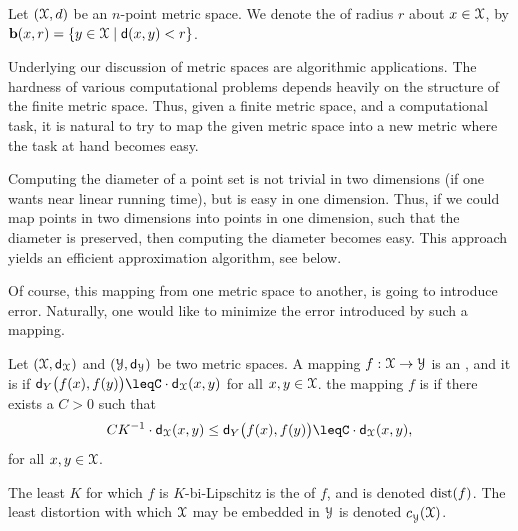 \begin{defn}
    Let $(\FMS,d)$ be an $n$-point metric space. We denote the
     of radius $r$ about $x \in \FMS$, by
    $\Ball(x,r) = \Set{ y \in \FMS }{ \dY{x}{y} < r }$.
\end{defn}

Underlying our discussion of metric spaces are algorithmic
applications. The hardness of various computational problems depends
heavily on the structure of the finite metric space. Thus, given a
finite metric space, and a computational task, it is natural to try to
map the given metric space into a new metric where the task at hand
becomes easy.

\begin{example}
    Computing the diameter of a point set is not trivial in two
    dimensions (if one wants near linear running time), but is easy in
    one dimension. Thus, if we could map points in two dimensions into
    points in one dimension, such that the diameter is preserved, then
    computing the diameter becomes easy. This approach yields an
    efficient approximation algorithm, see  below.
\end{example}

Of course, this mapping from one metric space to another, is going to
introduce error.  Naturally, one would like to minimize the error
introduced by such a mapping.
\begin{defn}
    Let $(\FMS,\DistChar_\FMS)$ and $(\FMSB,\DistChar_\FMSB)$ be two
    metric spaces. A mapping $f:\FMS \to \FMSB$ is an
    , and it is  if
    \begin{math}
        \DistChar_Y\bigl(f(x),f(y) \bigr)%
        \leq%
        C \cdot \DistChar_\FMS(x,y)
    \end{math}
    for all $x,y\in \FMS$.  the mapping $f$ is
     if there exists a $C > 0$ such that
    \begin{equation*}
        CK^{-1} \cdot \DistChar_\FMS(x,y)%
        \leq%
        \DistChar_Y\bigl(f(x),f(y)\bigr)%
        \leq%
        C\cdot
        \DistChar_\FMS(x,y),
    \end{equation*}
    for all $x,y\in \FMS$.
    
    The least $K$ for which $f$ is $K$-bi-Lipschitz is the
     of $f$, and is denoted $\mathrm{dist}(f)$. The least
    distortion with which $\FMS$ may be embedded in $\FMSB$ is denoted
    $c^{}_\FMSB(\FMS)$.  
     
\end{defn}


